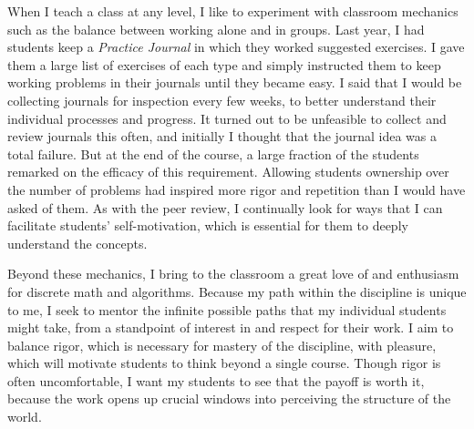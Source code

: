 \documentclass[12pt]{article}
\begin{document}
When I teach a class at any level, I like to experiment with classroom
mechanics such as the balance between working alone and in groups. 
Last year, I had students keep a \emph{Practice Journal} in which they worked
suggested exercises. I gave them a large list of exercises of 
each type and simply instructed them to keep working problems in their journals
until they became easy. I said that I would 
be collecting journals for inspection every few weeks, to better understand
their individual processes and progress.  It turned out to be
unfeasible to collect and review journals this often, and initially I thought
that the journal idea was a total failure. But at the end of the course, 
a large fraction of the students remarked on the efficacy of this requirement. 
Allowing students ownership over the number of problems had inspired more rigor
and repetition than I would have asked of them. As with the peer review, I
continually look for ways that I can facilitate students' self-motivation, 
which is essential for them to deeply understand the concepts.

Beyond these mechanics, I bring to the classroom a great love of and enthusiasm
for discrete math and algorithms. Because my path within the discipline is unique to me, 
I seek to mentor the infinite possible paths that my individual students might take, from a standpoint of interest in and respect for their work. 
I aim to balance rigor, which is necessary for mastery of the discipline, with
pleasure, which will motivate students to think beyond a single course. 
Though rigor is often uncomfortable, I want my students to see that the payoff
is worth it, because the work opens up crucial windows into perceiving 
the structure of the world. 
\end{document}
